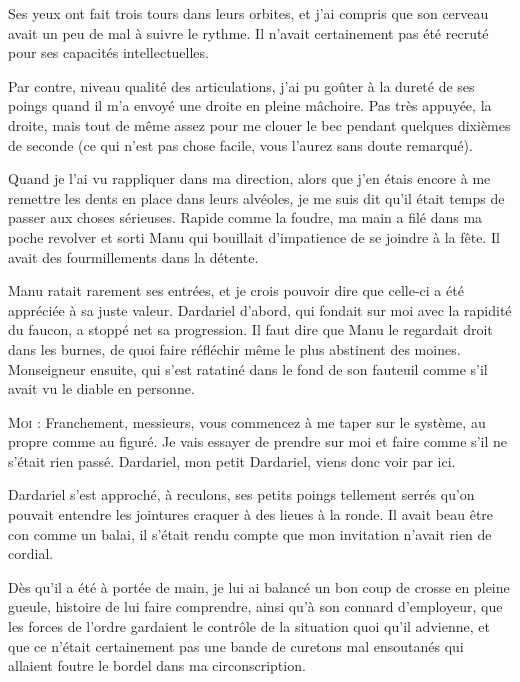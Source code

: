Ses yeux ont fait trois tours dans leurs orbites, et j’ai compris que son cerveau avait un peu de mal à suivre le rythme. Il n’avait certainement pas été recruté pour ses capacités intellectuelles.

Par contre, niveau qualité des articulations, j’ai pu goûter à la dureté de ses poings quand il m’a envoyé une droite en pleine mâchoire. Pas très appuyée, la droite, mais tout de même assez pour me clouer le bec pendant quelques dixièmes de seconde (ce qui n’est pas chose facile, vous l’aurez sans doute remarqué).

Quand je l’ai vu rappliquer dans ma direction, alors que j’en étais encore à me remettre les dents en place dans leurs alvéoles, je me suis dit qu’il était temps de passer aux choses sérieuses. Rapide comme la foudre, ma main a filé dans ma poche revolver et sorti Manu qui bouillait d’impatience de se joindre à la fête. Il avait des fourmillements dans la détente.

Manu ratait rarement ses entrées, et je crois pouvoir dire que celle-ci a été appréciée à sa juste valeur. Dardariel d’abord, qui fondait sur moi avec la rapidité du faucon, a stoppé net sa progression. Il faut dire que Manu le regardait droit dans les burnes, de quoi faire réfléchir même le plus abstinent des moines. Monseigneur ensuite, qui s’est ratatiné dans le fond de son fauteuil comme s’il avait vu le diable en personne.

\begin{dialogue}

\textsc{Moi} : Franchement, messieurs, vous commencez à me taper sur le système, au propre comme au figuré. Je vais essayer de prendre sur moi et faire comme s’il ne s’était rien passé. Dardariel, mon petit Dardariel, viens donc voir par ici.

\end{dialogue}

Dardariel s’est approché, à reculons, ses petits poings tellement serrés qu’on pouvait entendre les jointures craquer à des lieues à la ronde. Il avait beau être con comme un balai, il s’était rendu compte que mon invitation n’avait rien de cordial.

Dès qu’il a été à portée de main, je lui ai balancé un bon coup de crosse en pleine gueule, histoire de lui faire comprendre, ainsi qu’à son connard d’employeur, que les forces de l’ordre gardaient le contrôle de la situation quoi qu’il advienne, et que ce n’était certainement pas une bande de curetons mal ensoutanés qui allaient foutre le bordel dans ma circonscription.

